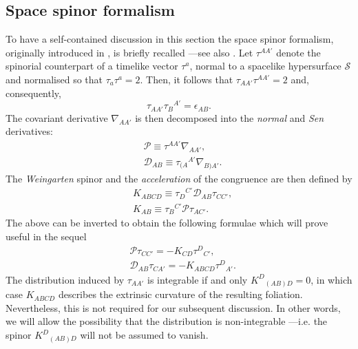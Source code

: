 \documentclass[10pt,a4paper]{article}
\theoremstyle{plain}
\begin{document}
\subsection*{Space spinor formalism} %
\label{SpaceSpinorFormalism}
To have a self-contained discussion in this section the space spinor
formalism, originally introduced in \cite{Som80}, is briefly recalled
---see also \cite{GarVal08c,BaeVal10b,CFEbook}.  Let $\tau^{AA'}$
denote the spinorial counterpart of a timelike vector $\tau^{a}$,
normal to a spacelike hypersurface $\mathcal{S}$ and normalised so
that $\tau_{a}\tau^{a}=2$.  Then, it follows that
$\tau_{AA'}\tau^{AA'}=2$ and, consequently,
\[\tau_{AA'}\tau_B{}^{A'}=\epsilon_{AB}.\]  
The covariant derivative $\nabla_{AA'}$ is then decomposed into the
\emph{normal} and \emph{Sen} derivatives:
\begin{align*}
& \mathcal{P}\equiv \tau^{AA'}\nabla_{AA'},\\ & \mathcal{D}_{AB}\equiv
  \tau_{(A}{}^{A'}\nabla_{B)A'}.
\end{align*}
The \emph{Weingarten} spinor and the \emph{acceleration} of the
congruence are then defined by
\begin{align*}
& K_{ABCD} \equiv \tau_{D}{}^{C'} \mathcal{D}_{AB}\tau_{CC'},\\ &
  K_{AB} \equiv \tau_{B}{}^{C'} \mathcal{P}\tau_{AC'}.
\end{align*}
The above can be inverted to obtain the following formulae which will
prove useful in the sequel
\begin{align*}
& \mathcal{P} \tau_{CC'}=- K_{CD} \tau^{D}{}_{C'},\\ &
  \mathcal{D}_{AB}\tau_{CA'} = - K_{ABCD} \tau^{D}{}_{A'}.
\end{align*}
The distribution induced by $\tau_{AA'}$ is integrable if and only
$K^D{}_{(AB)D}=0$, in which case $K_{ABCD}$ describes the extrinsic
curvature of the resulting foliation.
 Nevertheless, this is not required for our subsequent discussion.
In other words, we will allow
 the possibility that the distribution is non-integrable
---i.e. the spinor $ K^D{}_{(AB)D}$ will not be assumed
to vanish. 

\medskip
\end{document}
